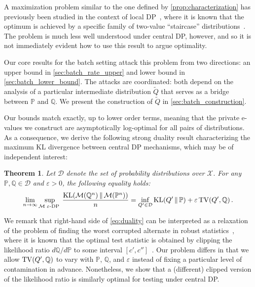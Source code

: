 \documentclass{article}
\DeclareMathOperator{\KLop}{KL}
\newcommand{\KL}[2]{%
  \mathchoice
    {\KLop\!\left(#1\,\middle\|\,#2\right)}%
    {\KLop(#1\,\Vert\,#2)}%
    {\KLop(#1\,\Vert\,#2)}%
    {\KLop(#1\,\Vert\,#2)}%
}
\DeclareMathOperator{\TVop}{TV}
\newcommand{\TV}[2]{
  \mathchoice
    {\TVop\!\left(#1,#2\right)}%
    {\TVop(#1,#2)}%
    {\TVop(#1,#2)}%
    {\TVop(#1,#2)}%
}
\newcommand{\Null}{\mathbb{P}}
\newcommand{\Alt}{\mathbb{Q}}
\newcommand{\M}{\mathcal{M}}
\newcommand{\eps}{\varepsilon}
\newtheorem{theorem}{Theorem}[section]
\begin{document}
A maximization problem similar to the one defined by \cref{prop:characterization} has previously been studied in the context of local DP~\citep{duchi2014localprivacydataprocessing}, where it is known that the optimum is achieved by a specific family of two-value ``staircase'' distributions~\citep{kairouz2015extremalmechanismslocaldifferential}. 
The problem is much less well understood under central DP, however, and so it is not immediately evident how to use this result to argue optimality.

Our core results for the batch setting attack this problem from two directions: an upper bound in \cref{sec:batch_rate_upper} and lower bound in \cref{sec:batch_lower_bound}.
The attacks are coordinated: both depend on the analysis of a particular intermediate distribution $\widetilde Q$ that serves as a bridge between $\Null$ and $\Alt$. We present the construction of $\widetilde Q$ in \cref{sec:batch_construction}. 

Our bounds match exactly, up to lower order terms, meaning that the private e-values we construct are asymptotically log-optimal for all pairs of distributions. As a consequence, we derive the following strong duality result characterizing the maximum KL divergence between central DP mechanisms, which may be of independent interest:

\begin{theorem}\label{thm:duality}
    Let $\mathcal{D}$ denote the set of probability distributions over $\mathcal{X}$. For any $\Null,\Alt \in \mathcal{D}$ and $\eps > 0$, the following equality holds:
    \begin{equation}\label{eq:duality}
    \lim_{n\to\infty}\sup_{\M \hspace{.1cm}\eps\text{-DP }}   \frac{\KL{\M(\Alt^n)}{\M(\Null^n)}}{n} = \inf_{Q' \in \mathcal{D}} \KL{Q'}{\Null} + \eps \TV{Q'}{\Alt}.
\end{equation}
\end{theorem}

We remark that right-hand side of \eqref{eq:duality} can be interpreted as a relaxation of the problem of finding the worst corrupted alternate in robust statistics~\citep{huber1973capacities}, where it is known that the optimal test statistic is obtained by clipping the likelihood ratio $d\Alt/d\Null$ to some interval $[c',c'']$~\citep{huber1965robust}. Our problem differs in that we allow $\TV{Q'}{\Alt}$ to vary with $\Null$, $\Alt$, and $\eps$ instead of fixing a particular level of contamination in advance. Nonetheless, we show that a (different) clipped version of the likelihood ratio is similarly optimal for testing under central DP.
 
\end{document}
